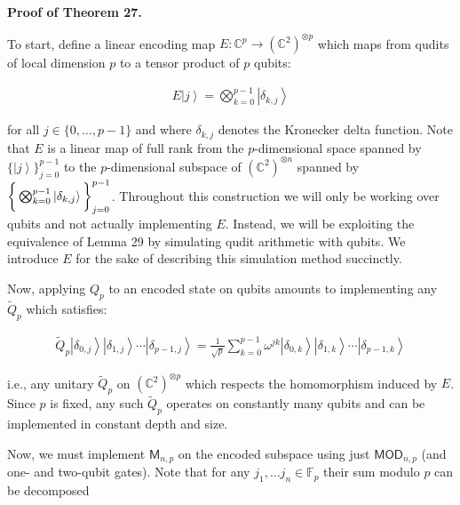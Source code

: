 \documentclass[10pt,a4paper]{article}
\begin{document}
\par\medskip\noindent\textbf{Proof of Theorem 27.}\par




To start, define a linear encoding map $E\colon\mathbb{C}^{p}\to(\mathbb{C}^{2})^{\otimes p}$ which maps from qudits of local dimension $p$ to a tensor product of $p$ qubits:\par


\[\begin{gathered}
\displaystyle E\left|j\right\rangle=\bigotimes_{k=0}^{p-1}\left|\delta_{k,j}\right\rangle
\end{gathered}\]


for all $j\in\{0,\ldots,p-1\}$ and where $\delta_{k,j}$ denotes the Kronecker delta function. Note that $E$ is a linear map of full rank from the $p$-dimensional space spanned by $\{\left|j\right\rangle\}_{j=0}^{p-1}$ to the $p$-dimensional subspace of $(\mathbb{C}^{2})^{\otimes n}$ spanned by$\bigg{\{}\bigotimes_{k=0}^{p-1}\left|\delta_{k,j}\right\rangle\bigg{\}}_{j=0}^{p-1}$. Throughout this construction we will only be working over qubits and not actually implementing $E$. Instead, we will be exploiting the equivalence of Lemma 29 by simulating qudit arithmetic with qubits. We introduce $E$ for the sake of describing this simulation method succinctly.\par




Now, applying $Q_{p}$ to an encoded state on qubits amounts to implementing any $\tilde{Q}_{p}$ which satisfies:\par


\[\begin{gathered}
\tilde{Q}_{p}\left|\delta_{0,j}\right\rangle\left|\delta_{1,j}\right\rangle\cdots\left|\delta_{p-1,j}\right\rangle=\frac{1}{\sqrt{p}}\sum_{k=0}^{p-1}\omega^{jk}\left|\delta_{0,k}\right\rangle\left|\delta_{1,k}\right\rangle\cdots\left|\delta_{p-1,k}\right\rangle
\end{gathered}\]


i.e., any unitary $\tilde{Q}_{p}$ on $(\mathbb{C}^{2})^{\otimes p}$ which respects the homomorphism induced by $E$. Since $p$ is fixed, any such $\tilde{Q}_{p}$ operates on constantly many qubits and can be implemented in constant depth and size.\par




Now, we must implement $\mathsf{M}_{n,p}$ on the encoded subspace using just $\mathsf{MOD}_{n,p}$ (and one- and two-qubit gates). Note that for any $j_{1},\dots j_{n}\in\mathbb{F}_{p}$ their sum modulo $p$ can be decomposed
\end{document}
